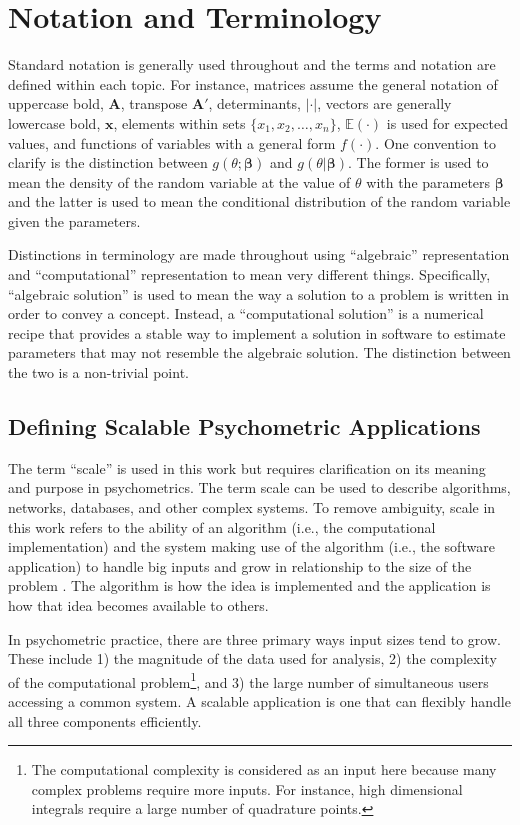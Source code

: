 \documentclass[12pt]{article}
\begin{document}
\section*{Notation and Terminology}

Standard notation is generally used throughout and the terms and notation are defined within each topic. For instance, matrices assume the general notation of uppercase bold, $\bm{A}$, transpose $\bm{A}'$, determinants, $|\cdot|$, vectors are generally lowercase bold, $\bm{x}$, elements within sets $\{x_1, x_2, \ldots, x_n\}$, $\mathbb{E}(\cdot)$ is used for expected values, and functions of variables with a general form $f(\cdot)$. One convention to clarify is the distinction between $g(\theta;\bm{\beta})$ and $g(\theta|\bm{\beta})$. The former is used to mean the density of the random variable at the value of $\theta$ with the parameters $\bm{\beta}$ and the latter is used to mean the conditional distribution of the random variable given the parameters. 

Distinctions in terminology are made throughout using ``algebraic'' representation and ``computational'' representation to mean very different things. Specifically, ``algebraic solution'' is used to mean the way a solution to a problem is written in order to convey a concept. Instead, a ``computational solution'' is a numerical recipe that provides a stable way to implement a solution in software to estimate parameters that may not resemble the algebraic solution. The distinction between the two is a non-trivial point.                           

\subsection*{Defining Scalable Psychometric Applications}

The term ``scale'' is used in this work but requires clarification on its meaning and purpose in psychometrics. The term scale can be used to describe algorithms, networks, databases, and other complex systems. To remove ambiguity, scale in this work refers to the ability of an algorithm (i.e., the computational implementation) and the system making use of the algorithm (i.e., the software application) to handle big inputs and grow in relationship to the size of the problem \cite{teng}. The algorithm is how the idea is implemented and the application is how that idea becomes available to others.

In psychometric practice, there are three primary ways input sizes tend to grow. These include 1) the magnitude of the data used for analysis, 2) the complexity of the computational problem\footnote{The computational complexity is considered as an input here because many complex problems require more inputs. For instance, high dimensional integrals require a large number of quadrature points.}, and 3) the large number of simultaneous users accessing a common system. A scalable application is one that can flexibly handle all three components efficiently. 
\end{document}
